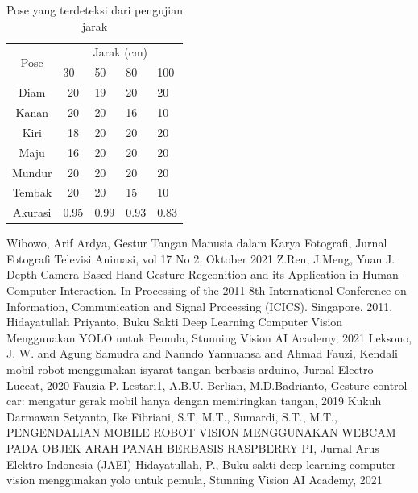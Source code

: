 \documentclass[conference]{IEEEtran}
\begin{document}
\begin{table}[H]
  \centering
  \caption{Pose yang terdeteksi dari pengujian jarak}
  \label{tab:hasiljarak}
  \begin{tabular}{|c|clll|}
    \hline
    \multirow{2}{*}{Pose} & \multicolumn{4}{c|}{Jarak (cm)}                                                   \\ \cline{2-5} 
                          & \multicolumn{1}{l|}{30} & \multicolumn{1}{l|}{50} & \multicolumn{1}{l|}{80} & 100 \\ \hline
    Diam                  & \multicolumn{1}{c|}{20}   & \multicolumn{1}{l|}{19}   & \multicolumn{1}{l|}{20}   &   20  \\ \hline
    Kanan                 & \multicolumn{1}{c|}{20}   & \multicolumn{1}{l|}{20}   & \multicolumn{1}{l|}{16}   &   10  \\ \hline
    Kiri                  & \multicolumn{1}{c|}{18}   & \multicolumn{1}{l|}{20}   & \multicolumn{1}{l|}{20}   &   20  \\ \hline
    Maju                  & \multicolumn{1}{c|}{16}   & \multicolumn{1}{l|}{20}   & \multicolumn{1}{l|}{20}   &   20  \\ \hline
    Mundur                & \multicolumn{1}{c|}{20}   & \multicolumn{1}{l|}{20}   & \multicolumn{1}{l|}{20}   &   20  \\ \hline
    Tembak                & \multicolumn{1}{c|}{20}   & \multicolumn{1}{l|}{20}   & \multicolumn{1}{l|}{15}   &   10  \\ \hline
    Akurasi                  & \multicolumn{1}{c|}{0.95}   & \multicolumn{1}{l|}{0.99}   & \multicolumn{1}{l|}{0.93}   &   0.83  \\ \hline
  \end{tabular}
\end{table}

\begin{thebibliography}{00}
 Wibowo, Arif Ardya, Gestur Tangan Manusia dalam Karya Fotografi, Jurnal Fotografi Televisi Animasi, vol 17 No 2, Oktober 2021
 Z.Ren, J.Meng, Yuan J. Depth Camera Based Hand Gesture Regconition and its Application in Human-Computer-Interaction. In Processing of the 2011 8th International Conference on Information, Communication and Signal Processing (ICICS). Singapore. 2011.
 Hidayatullah Priyanto, Buku Sakti Deep Learning Computer Vision Menggunakan YOLO untuk Pemula, Stunning Vision AI Academy, 2021
 Leksono, J. W. and Agung Samudra and Nanndo Yannuansa and Ahmad Fauzi, Kendali mobil robot menggunakan isyarat tangan berbasis arduino, Jurnal Electro Luceat, 2020
 Fauzia P. Lestari1, A.B.U. Berlian, M.D.Badrianto, Gesture control car: mengatur gerak mobil hanya dengan memiringkan tangan, 2019
 Kukuh Darmawan Setyanto, Ike Fibriani, S.T, M.T., Sumardi, S.T., M.T., PENGENDALIAN MOBILE ROBOT VISION MENGGUNAKAN WEBCAM PADA OBJEK ARAH PANAH BERBASIS RASPBERRY PI, Jurnal Arus Elektro Indonesia (JAEI) 
 Hidayatullah, P., Buku sakti deep learning computer vision menggunakan yolo untuk pemula, Stunning Vision AI Academy, 2021
\end{thebibliography}
\end{document}
